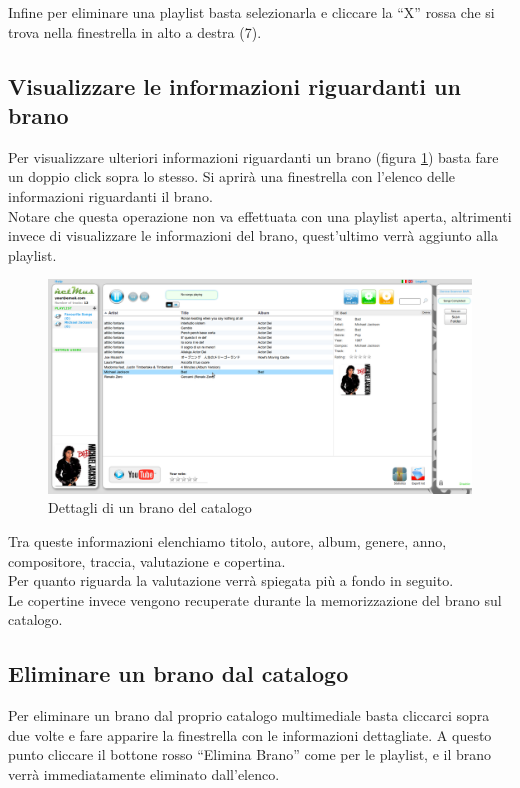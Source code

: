 Infine per eliminare una playlist basta selezionarla e cliccare la ``X'' rossa che
si trova nella finestrella in alto a destra (7).

\subsection{Visualizzare le informazioni riguardanti un brano}

Per visualizzare ulteriori informazioni riguardanti un brano (figura
\ref{fig:dettagli}) basta fare un doppio click sopra lo stesso. Si aprir\`a una
finestrella con l'elenco delle informazioni riguardanti il brano.\\
Notare che questa operazione non va effettuata con una playlist aperta,
altrimenti invece di visualizzare le informazioni del brano, quest'ultimo
verr\`a aggiunto alla playlist.\\

\begin{figure}[!htbp]
  \centering
  \includegraphics[width=14cm]{img/MU/info_song.png}
\caption{Dettagli di un brano del catalogo}
\label{fig:dettagli}
\end{figure}

Tra queste informazioni elenchiamo titolo, autore, album, genere, anno,
compositore, traccia, valutazione e copertina.\\
Per quanto riguarda la valutazione verr\`a spiegata pi\`u a fondo in seguito.\\
Le copertine invece vengono recuperate durante la memorizzazione del brano sul
catalogo.

\subsection{Eliminare un brano dal catalogo}

Per eliminare un brano dal proprio catalogo multimediale basta cliccarci sopra
due volte e fare apparire la finestrella con le informazioni dettagliate. A
questo punto cliccare il bottone rosso ``Elimina Brano'' come per le
playlist, e il brano verr\`a immediatamente eliminato dall'elenco.

